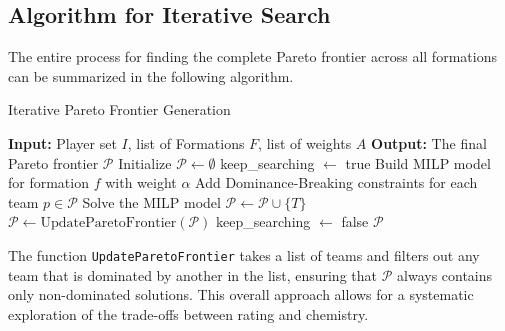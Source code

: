 \documentclass{article}
\begin{document}
\subsection{Algorithm for Iterative Search}
The entire process for finding the complete Pareto frontier across all formations can be summarized in the following algorithm.

\begin{algorithm}
\caption{Iterative Pareto Frontier Generation}
\begin{algorithmic}[1]
\STATE \textbf{Input:} Player set $I$, list of Formations $F$, list of weights $A$
\STATE \textbf{Output:} The final Pareto frontier $\mathcal{P}$
\STATE Initialize $\mathcal{P} \leftarrow \emptyset$
        \STATE keep\_searching $\leftarrow$ true
            \STATE Build MILP model for formation $f$ with weight $\alpha$
            \STATE Add Dominance-Breaking constraints for each team $p \in \mathcal{P}$
            \STATE Solve the MILP model
                \STATE $\mathcal{P} \leftarrow \mathcal{P} \cup \{T\}$
                \STATE $\mathcal{P} \leftarrow \text{UpdateParetoFrontier}(\mathcal{P})$ 
            \ELSE
                \STATE keep\_searching $\leftarrow$ false 
            \ENDIF
        \ENDWHILE
    \ENDFOR
\ENDFOR
\RETURN $\mathcal{P}$
\end{algorithmic}
\end{algorithm}

The function \texttt{UpdateParetoFrontier} takes a list of teams and filters out any team that is dominated by another in the list, ensuring that $\mathcal{P}$ always contains only non-dominated solutions. This overall approach allows for a systematic exploration of the trade-offs between rating and chemistry.
\end{document}
